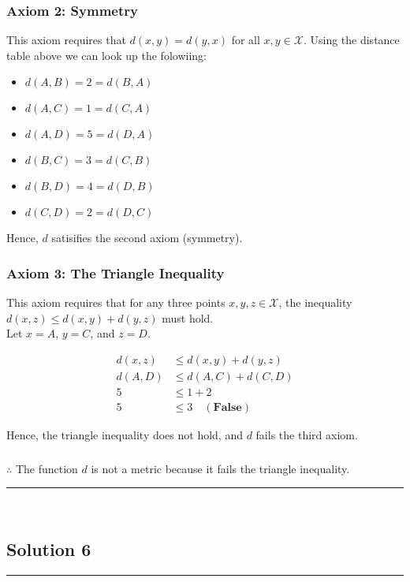 \documentclass{article}
\begin{document}
\subsubsection*{Axiom 2: Symmetry}
\parbox{\textwidth}{
This axiom requires that $d(x, y) = d(y, x)$ for all $x, y \in \mathcal{X}$. Using the distance table above we can look up the folowiing:
\begin{itemize}
    \item $d(A, B) = 2 = d(B, A)$
    \item $d(A, C) = 1 = d(C, A)$
    \item $d(A, D) = 5 = d(D, A)$
    \item $d(B, C) = 3 = d(C, B)$
    \item $d(B, D) = 4 = d(D, B)$
    \item $d(C, D) = 2 = d(D, C)$
\end{itemize}
Hence, $d$ satisifies the second axiom (symmetry).
}

\subsubsection*{Axiom 3: The Triangle Inequality}
\parbox{\textwidth}{
This axiom requires that for any three points $x, y, z \in \mathcal{X}$, the inequality $d(x, z) \leq d(x, y) + d(y, z)$ must hold. \\
Let $x=A$, $y=C$, and $z=D$.
}
\begin{align*}
    d(x, z) &\leq d(x, y) + d(y, z) \\
    d(A, D) &\leq d(A, C) + d(C, D) \\
    5 &\leq 1 + 2 \\
    5 &\leq 3 \quad (\textbf{False})
\end{align*}
\parbox{\textwidth}{
Hence, the triangle inequality does not hold, and $d$ fails the third axiom.
}

\subsubsection*{\normalfont}{$\therefore$ The function $d$ is not a metric because it fails the triangle inequality.}

\noindent\rule{\textwidth}{0.4pt}\\

\newpage

\subsection*{Solution 6}
\noindent\rule{\textwidth}{0.4pt}\\
\end{document}
